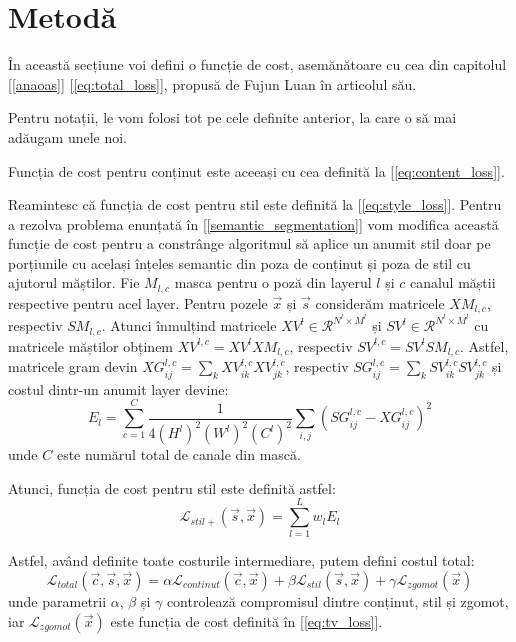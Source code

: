 \section{Metodă}
În această secțiune voi defini o funcție de cost, asemănătoare cu cea din capitolul [\ref{anaoas}] [\ref{eq:total_loss}], propusă de Fujun Luan în articolul său.

Pentru notații, le vom folosi tot pe cele definite anterior, la care o să mai adăugam unele noi.

Funcția de cost pentru conținut este aceeași cu cea definită la [\ref{eq:content_loss}].

Reamintesc că funcția de cost pentru stil este definită la [\ref{eq:style_loss}]. Pentru a rezolva problema enunțată în [\ref{semantic_segmentation}] vom modifica această funcție de cost pentru a constrânge algoritmul să aplice un anumit stil doar pe porțiunile cu același înțeles semantic din poza de conținut și poza de stil cu ajutorul măștilor. Fie $M_{l, c}$ masca pentru o poză din layerul $l$ și $c$ canalul măștii respective pentru acel layer. Pentru pozele $\vec{x}$ și $\vec{s}$ considerăm matricele $XM_{l, c}$, respectiv $SM_{l, c}$. Atunci înmulțind matricele $XV^l \in \mathcal{R}^{N^{l} \times M^{l}}$ și $SV^l \in \mathcal{R}^{N^{l} \times M^{l}}$ cu matricele măștilor obținem $XV^{l, c} = XV^l XM_{l, c}$, respectiv $SV^{l, c} = SV^l SM_{l, c}$. Astfel, matricele gram devin $XG_{ij}^{l, c} = \displaystyle \sum_{k}{XV_{ik}^{l, c} XV_{jk}^{l, c}}$, respectiv $SG_{ij}^{l, c} = \displaystyle \sum_{k}{SV_{ik}^{l, c} SV_{jk}^{l, c}}$ și costul dintr-un anumit layer devine:
\begin{equation}
\label{eq:layer_style_loss_dpst}
E_l = \sum_{c=1}^{C}{\frac{1}{4(H^{l})^{2}(W^{l})^{2}(C^{l})^{2}} \sum_{i, j}{(SG_{ij}^{l, c} - XG_{ij}^{l, c})^2}}
\end{equation}
unde $C$ este numărul total de canale din mască.

Atunci, funcția de cost pentru stil este definită astfel:
\begin{equation}
\label{eq:style_loss_dpst}
\mathcal{L}_{stil+}(\vec{s}, \vec{x}) = \sum_{l=1}^{L} w_l E_l
\end{equation}

Astfel, având definite toate costurile intermediare, putem defini costul total:
\begin{equation}
\label{eq:total_loss_dpst}
\mathcal{L}_{total}(\vec{c}, \vec{s}, \vec{x}) = \alpha \mathcal{L}_{continut}(\vec{c}, \vec{x}) + \beta \mathcal{L}_{stil}(\vec{s}, \vec{x}) + \gamma \mathcal{L}_{zgomot}(\vec{x})
\end{equation}
unde parametrii $\alpha$, $\beta$ și $\gamma$ controlează compromisul dintre conținut, stil și zgomot, iar $\mathcal{L}_{zgomot}(\vec{x})$ este funcția de cost definită în [\ref{eq:tv_loss}].


